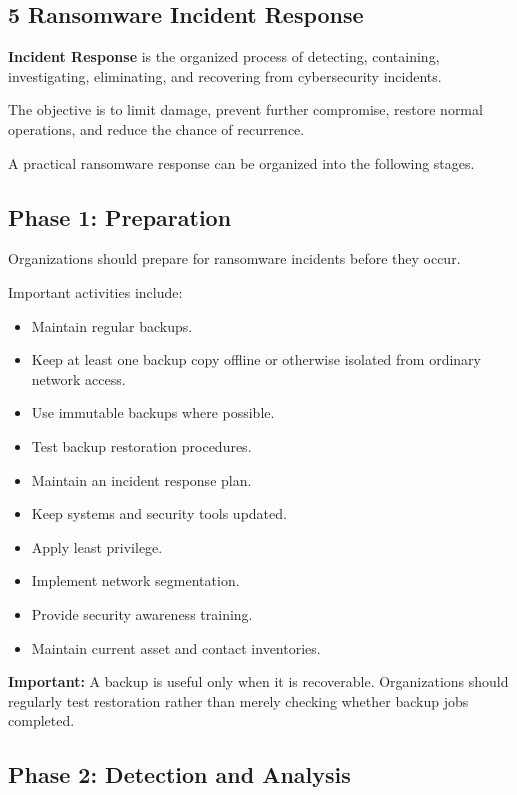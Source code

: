 \subsection{5 Ransomware Incident Response}

\textbf{Incident Response} is the organized process of detecting, containing, investigating, eliminating, and recovering from cybersecurity incidents.

The objective is to limit damage, prevent further compromise, restore normal operations, and reduce the chance of recurrence.

A practical ransomware response can be organized into the following stages.

\subsection{Phase 1: Preparation}

Organizations should prepare for ransomware incidents before they occur.

Important activities include:

\begin{itemize}
\item Maintain regular backups.
\item Keep at least one backup copy offline or otherwise isolated from ordinary network access.
\item Use immutable backups where possible.
\item Test backup restoration procedures.
\item Maintain an incident response plan.
\item Keep systems and security tools updated.
\item Apply least privilege.
\item Implement network segmentation.
\item Provide security awareness training.
\item Maintain current asset and contact inventories.
\end{itemize}

\textbf{Important:} A backup is useful only when it is recoverable. Organizations should regularly test restoration rather than merely checking whether backup jobs completed.

\subsection{Phase 2: Detection and Analysis}

